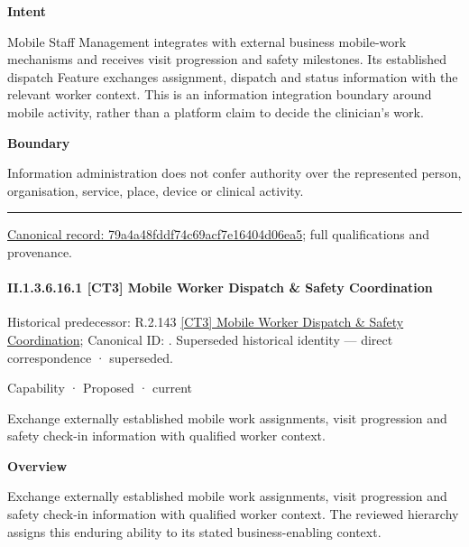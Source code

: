 \textbf{Intent}



Mobile Staff Management integrates with external business mobile-work mechanisms and receives visit progression and safety milestones. Its established dispatch Feature exchanges assignment, dispatch and status information with the relevant worker context. This is an information integration boundary around mobile activity, rather than a platform claim to decide the clinician's work.



\textbf{Boundary}



Information administration does not confer authority over the represented person, organisation, service, place, device or clinical activity.



\medskip\hrule\medskip

{\footnotesize \href{../../../../../../../continuum/strategy/capability/79a4a48fddf74c69acf7e16404d06ea5.md}{Canonical record: 79a4a48fddf74c69acf7e16404d06ea5}; full qualifications and provenance.}\par
\paragraph*{II.1.3.6.16.1 [CT3] Mobile Worker Dispatch \& Safety Coordination}
\label{navigation:II.1.3.6.16.1}

{\small Historical predecessor: R.2.143 \hyperref[element:5aafd1f4bff046b2b532c20dfb191473]{[CT3] Mobile Worker Dispatch \& Safety Coordination}; Canonical ID: \texttt{}. Superseded historical identity — direct correspondence · superseded.}\par
\label{element:d72164668dfe448bbebe74e9e1a75233}
{\small Capability · Proposed · current}\par

Exchange externally established mobile work assignments, visit progression and safety check-in information with qualified worker context.



\textbf{Overview}



Exchange externally established mobile work assignments, visit progression and safety check-in information with qualified worker context. The reviewed hierarchy assigns this enduring ability to its stated business-enabling context.



